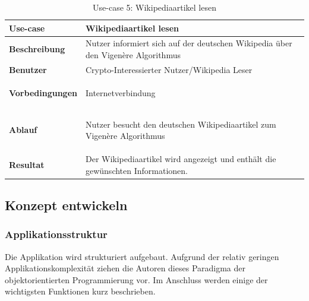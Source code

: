 \documentclass[11pt,paper=a4,final]{scrartcl}
\begin{document}
\begin{table}[h!]
  \centering
  \begin{tabular}{|l|p{12cm}|}\hline
    \bf Use-case & \bf Wikipediaartikel lesen \\ \hline
    \bf Beschreibung & Nutzer informiert sich auf der deutschen Wikipedia \"uber
    den Vigen\`ere Algorithmus \\ \hline
    \bf Benutzer & Crypto-Interessierter Nutzer/Wikipedia Leser \\ \hline
    \bf Vorbedingungen & \begin{itemize*} \item Internetverbindung
    \end{itemize*} \\ \hline
    \bf Ablauf & \begin{itemize*}\item Nutzer besucht den deutschen
    Wikipediaartikel zum Vigen\`ere Algorithmus \end{itemize*} \\ \hline
    \bf Resultat & Der Wikipediaartikel wird angezeigt und enth\"alt die
    gew\"unschten Informationen. \\ \hline
  \end{tabular}
  \caption{Use-case 5: Wikipediaartikel lesen}
  \label{tab:usecase5}
\end{table}
\subsection{Konzept entwickeln}
\subsubsection{Applikationsstruktur}
Die Applikation wird strukturiert aufgebaut. Aufgrund der relativ geringen
Applikationskomplexit\"at ziehen die Autoren dieses Paradigma der
objektorientierten Programmierung vor. Im Anschluss werden einige der
wichtigsten Funktionen kurz beschrieben.
\end{document}
